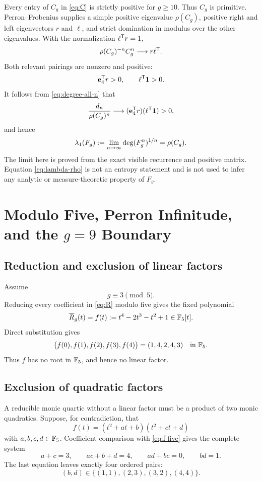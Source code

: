 \documentclass[11pt]{article}
\theoremstyle{remark}
\numberwithin{equation}{section}
\begin{document}
Every entry of \(C_g\) in \eqref{eq:C} is strictly positive for \(g\geq10\).
Thus \(C_g\) is primitive.  Perron--Frobenius supplies a simple positive
eigenvalue \(\rho(C_g)\), positive right and left eigenvectors \(r\) and
\(\ell\), and strict domination in modulus over the other eigenvalues.  With
the normalization \(\ell^{\mathsf{T}}r=1\),
\[
\rho(C_g)^{-n}C_g^n\longrightarrow r\ell^{\mathsf{T}}.
\]
Both relevant pairings are nonzero and positive:
\[
\mathbf{e}_4^{\mathsf{T}}r>0,\qquad
\ell^{\mathsf{T}}\mathbf{1}>0.
\]
It follows from \eqref{eq:degree-all-n} that
\[
\frac{d_n}{\rho(C_g)^n}
\longrightarrow
(\mathbf{e}_4^{\mathsf{T}}r)(\ell^{\mathsf{T}}\mathbf{1})>0,
\]
and hence
\begin{equation}\label{eq:lambda-rho}
\lambda_1(F_g)
:=\lim_{n\to\infty}\operatorname{deg}(F_g^n)^{1/n}
=\rho(C_g).
\end{equation}
The limit here is proved from the exact visible recurrence and positive
matrix.  Equation \eqref{eq:lambda-rho} is not an entropy statement and is
not used to infer any analytic or measure-theoretic property of \(F_g\).

\section{Modulo Five, Perron Infinitude, and the \texorpdfstring{\(g=9\)}{g=9} Boundary}\label{sec:modfive}

\subsection{Reduction and exclusion of linear factors}

Assume
\[
g\equiv3\pmod5.
\]
Reducing every coefficient in \eqref{eq:R} modulo five gives the fixed
polynomial
\begin{equation}\label{eq:f-five}
\overline{R}_g(t)
=f(t):=t^4-2t^3-t^2+1\in\mathbb{F}_{5}[t].
\end{equation}
Direct substitution gives
\begin{equation}\label{eq:f-values}
\bigl(f(0),f(1),f(2),f(3),f(4)\bigr)=(1,4,2,4,3)
\quad\text{in }\mathbb{F}_{5}.
\end{equation}
Thus \(f\) has no root in \(\mathbb{F}_{5}\), and hence no linear factor.

\subsection{Exclusion of quadratic factors}

A reducible monic quartic without a linear factor must be a product of two
monic quadratics.  Suppose, for contradiction, that
\[
f(t)=(t^2+at+b)(t^2+ct+d)
\]
with \(a,b,c,d\in\mathbb{F}_{5}\).  Coefficient comparison with
\eqref{eq:f-five} gives the complete system
\begin{equation}\label{eq:factor-system}
a+c=3,\qquad
ac+b+d=4,\qquad
ad+bc=0,\qquad
bd=1.
\end{equation}
The last equation leaves exactly four ordered pairs:
\begin{equation}\label{eq:bd-pairs}
(b,d)\in\{(1,1),(2,3),(3,2),(4,4)\}.
\end{equation}
\end{document}
